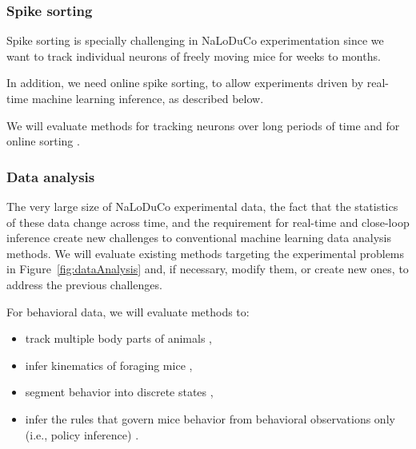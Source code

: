 \subsubsection{Spike sorting}

Spike sorting is specially challenging in NaLoDuCo experimentation since we
want to track individual neurons of freely moving mice for weeks to months.

In addition, we need online spike sorting, to allow experiments driven
by real-time machine learning inference, as described below.

We will evaluate methods for tracking neurons over long periods of time
\citep[e.g.,][]{yuanEtAl24,vanBeestEtAl24} and for online sorting
\citep[e.g.,][]{rutishauserEtAl06,santhanamEtAl04}.

\subsubsection{Data analysis}

The very large size of NaLoDuCo experimental data, the fact that the statistics
of these data change across time, and the requirement for real-time and
close-loop inference create new challenges to conventional machine learning
data analysis methods.
%
We will evaluate existing methods targeting the experimental problems
in Figure~\ref{fig:dataAnalysis} and, if necessary, modify them, or create new
ones, to address the previous challenges.

For behavioral data, we will evaluate methods to:

\begin{itemize}

    \item track multiple body parts of
animals \citep[e.g.,][and a switching-linear-dyanamical method using RFIDs that
we will develop]{mathisEtAl18,pereiraEtAl22,bidermanEtAl24},

    \item infer kinematics of foraging mice \citep[e.g.,][]{ldspython,challaEtAl11},

    \item segment behavior into discrete states \citep[e.g.,][and a hierarchical HMM
that we will develop]{wiltschkoEtAl15,hsuAndYttri21},

    \item infer the rules that govern mice behavior from behavioral observations
only (i.e., policy inference) \citep[e.g.,][]{ziebartEtAl08,zhuEtAl23}.

\end{itemize}

